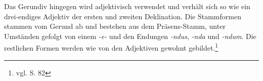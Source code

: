 Das Gerundiv hingegen wird adjektivisch verwendet und verhält sich so wie ein drei-endiges Adjektiv der ersten und zweiten Deklination. Die Stammformen stammen vom Gerund ab und bestehen aus dem Präsens-Stamm, unter Umständen gefolgt von einem \textit{-e-} und den Endungen \textit{-ndus}, \textit{-nda} und \textit{-ndum}. Die restlichen Formen werden wie von den Adjektiven gewohnt gebildet.\footnote{vgl. \cite{BAYER-LINDAUER1994} S. 82} \par
